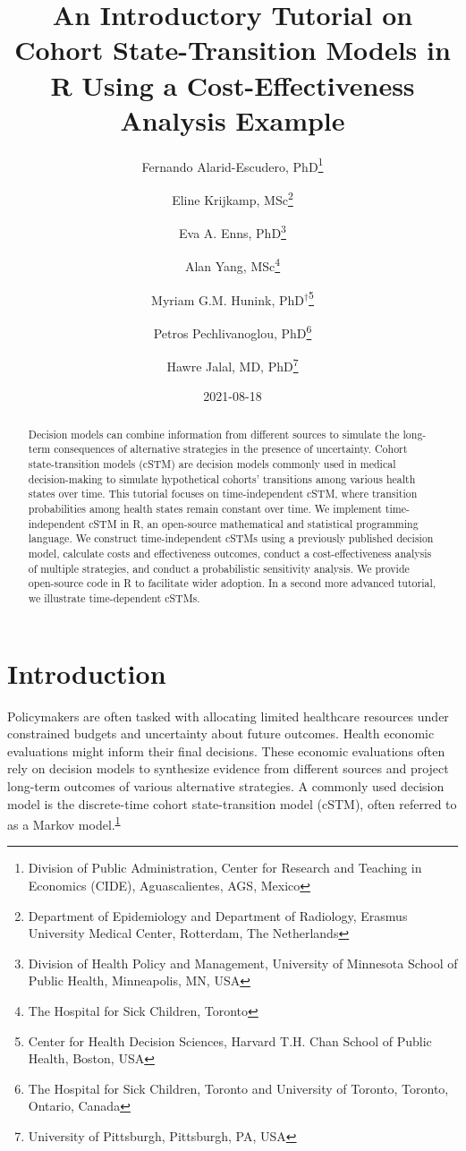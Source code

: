 \documentclass[
]{article}
\title{An Introductory Tutorial on Cohort State-Transition Models in R Using a Cost-Effectiveness Analysis Example}
\author{Fernando Alarid-Escudero, PhD\footnote{Division of Public Administration, Center for Research and Teaching in Economics (CIDE), Aguascalientes, AGS, Mexico} \and Eline Krijkamp, MSc\footnote{Department of Epidemiology and Department of Radiology, Erasmus University Medical Center, Rotterdam, The Netherlands} \and Eva A. Enns, PhD\footnote{Division of Health Policy and Management, University of Minnesota School of Public Health, Minneapolis, MN, USA} \and Alan Yang, MSc\footnote{The Hospital for Sick Children, Toronto} \and Myriam G.M. Hunink, PhD\(^\dagger\)\footnote{Center for Health Decision Sciences, Harvard T.H. Chan School of Public Health, Boston, USA} \and Petros Pechlivanoglou, PhD\footnote{The Hospital for Sick Children, Toronto and University of Toronto, Toronto, Ontario, Canada} \and Hawre Jalal, MD, PhD\footnote{University of Pittsburgh, Pittsburgh, PA, USA}}
\date{2021-08-18}
\begin{document}
\maketitle
\begin{abstract}
Decision models can combine information from different sources to simulate the long-term consequences of alternative strategies in the presence of uncertainty. Cohort state-transition models (cSTM) are decision models commonly used in medical decision-making to simulate hypothetical cohorts' transitions among various health states over time. This tutorial focuses on time-independent cSTM, where transition probabilities among health states remain constant over time. We implement time-independent cSTM in R, an open-source mathematical and statistical programming language. We construct time-independent cSTMs using a previously published decision model, calculate costs and effectiveness outcomes, conduct a cost-effectiveness analysis of multiple strategies, and conduct a probabilistic sensitivity analysis. We provide open-source code in R to facilitate wider adoption. In a second more advanced tutorial, we illustrate time-dependent cSTMs.
\end{abstract}

{
\setcounter{tocdepth}{2}
\tableofcontents
}
\hypertarget{introduction}{%
\section{Introduction}\label{introduction}}

Policymakers are often tasked with allocating limited healthcare resources under constrained budgets and uncertainty about future outcomes. Health economic evaluations might inform their final decisions. These economic evaluations often rely on decision models to synthesize evidence from different sources and project long-term outcomes of various alternative strategies. A commonly used decision model is the discrete-time cohort state-transition model (cSTM), often referred to as a Markov model.\textsuperscript{\protect\hyperlink{ref-Kuntz2017}{1}}
\end{document}
